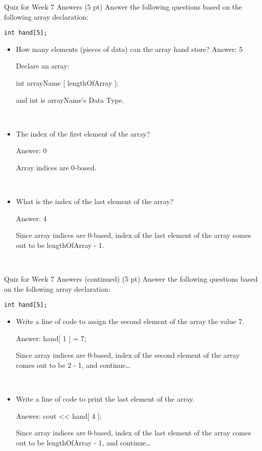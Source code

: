 \documentclass[presentation]{beamer}
\begin{document}
\begin{frame}[fragile,label=sec-3]{Quiz for Week 7 \alert{Answers}}
 (5 pt) Answer the following questions based on the following array declaration:
\begin{verbatim}
int hand[5];
\end{verbatim}
\begin{itemize}
\item How many elements (pieces of data) can the array hand store?
Answer: \alert{5}

\alert{Declare} an array: 

int \alert{arrayName} [ \alert{lengthOfArray} ]; 

and \alert{int} is arrayName's \alert{Data Type}.
\end{itemize}
\\
\begin{itemize}
\item The index of the \alert{first element} of the array?

Answer: \alert{0}

Array indices are \alert{0-based}.
\end{itemize}
\\

\begin{itemize}
\item What is the index of the \alert{last element} of the array?

Answer: \alert{4}

Since array indices are \alert{0-based}, index of the \alert{last} element of the array comes out to be \alert{lengthOfArray - 1}.
\end{itemize}

\\
\end{frame}

\begin{frame}[fragile,label=sec-4]{Quiz for Week 7 \alert{Answers} (continued)}
 (5 pt) Answer the following questions based on the following array declaration:
\begin{verbatim}
int hand[5];
\end{verbatim}
\begin{itemize}
\item Write a line of code to assign the second element of the array the value 7.

Answer: \alert{hand[ 1 ] = 7;}

Since array indices are \alert{0-based}, index of the \alert{second} element of the array comes out to be \alert{2 - 1}, and continue\ldots{}
\end{itemize}
\\
\begin{itemize}
\item Write a line of code to print the last element of the array.

Answer: \alert{cout << hand[ 4 ];}

Since array indices are \alert{0-based}, index of the \alert{last} element of the array comes out to be \alert{lengthOfArray - 1}, and continue\ldots{}
\end{itemize}
\\
\end{frame}
\end{document}
